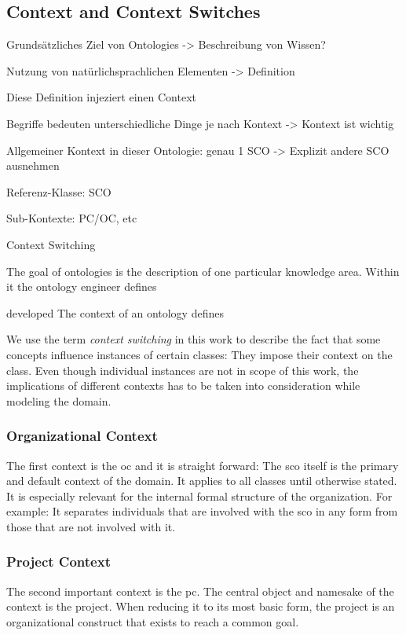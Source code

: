 \documentclass[a4paper, DIV=13, BCOR=0cm]{scrbook}
\begin{document}
\subsection{Context and Context Switches }
\begin{compactenum}
	\item Grundsätzliches Ziel von Ontologies -> Beschreibung von Wissen?
	\item Nutzung von natürlichsprachlichen Elementen -> Definition
	\item Diese Definition injeziert einen Context
	\item Begriffe bedeuten unterschiedliche Dinge je nach Kontext -> Kontext ist wichtig
	\item Allgemeiner Kontext in dieser Ontologie: genau 1 SCO -> Explizit andere SCO ausnehmen
	\item Referenz-Klasse: SCO
	\item Sub-Kontexte: PC/OC, etc
	\item Context Switching
\end{compactenum}

The goal of ontologies is the description of one particular knowledge area. Within it the ontology engineer defines 

developed The context of an ontology defines 

\label{context-switches}
We use the term \textit{context switching} in this work to describe the fact that some concepts influence instances of certain classes: They impose their context on the class. Even though individual instances are not in scope of this work, the implications of different contexts has to be taken into consideration while modeling the domain.

\subsubsection{Organizational Context}
\label{org-context}
The first context is the \gls{oc} and it is straight forward: The \gls{sco} itself is the primary and default context of the domain. It applies to all classes until otherwise stated. It is especially relevant for the internal formal structure of the organization. For example: It separates individuals that are involved with the \gls{sco} in any form from those that are not involved with it.

\subsubsection{Project Context}
\label{proj-context}
The second important context is the \gls{pc}. The central object and namesake of the context is the project. When reducing it to its most basic form, the project is an organizational construct that exists to reach a common goal.
\end{document}
